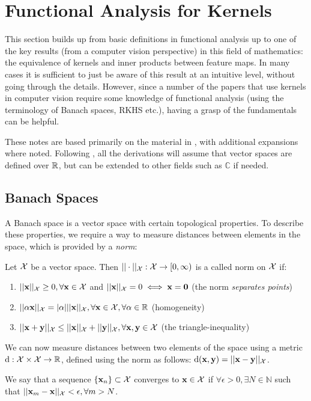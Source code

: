 \chapter{Functional Analysis for Kernels} \label{sec:functional-analysis}

This section builds up from basic definitions in functional analysis up to one of the key results (from a computer vision perspective) in this field of mathematics: the equivalence of kernels and inner products between feature maps.   In many cases it is sufficient to just be aware of this result at an intuitive level, without going through the details.  However, since a number of the papers that use kernels in computer vision require some knowledge of functional analysis (using the terminology of Banach spaces, RKHS etc.), having a grasp of the fundamentals can be helpful.  

These notes are based primarily on the material in \cite{sejdinovic2012rkhs}, with additional expansions where noted.  Following \cite{sejdinovic2012rkhs}, all the derivations will assume that vector spaces are defined over $\mathbb{R}$, but can be extended to other fields such as $\mathbb{C}$ if needed.

\section{Banach Spaces}

A Banach space is a vector space with certain topological properties. To describe these properties, we require a way to measure distances between elements in the space, which is provided by a \textit{norm}:

\begin{defn}
Let $\mathcal{X}$ be a vector space.  Then $|| \cdot ||_{\mathcal{X}} : \mathcal{X} \rightarrow [0,\infty)$ is a called norm on $\mathcal{X}$ if:
\begin{enumerate}
\item $|| \mathbf{x} ||_{\mathcal{X}} \geq 0 ,  \forall \mathbf{x} \in \mathcal{X}$ and $|| \mathbf{x} ||_{\mathcal{X}} = 0  \iff \mathbf{x} = \mathbf{0}$ (the norm \textit{separates points})
\item $|| \alpha \mathbf{x} ||_{\mathcal{X}} = | \alpha | || \mathbf{x} ||_{\mathcal{X}} ,  \forall \mathbf{x} \in \mathcal{X}, \forall \alpha \in \mathbb{R}$ (homogeneity)
\item $ || \mathbf{x} + \mathbf{y} ||_{\mathcal{X}} \leq || \mathbf{x} ||_{\mathcal{X}} + || \mathbf{y} ||_{\mathcal{X}}, \forall \mathbf{x}, \mathbf{y} \in \mathcal{X}$ (the triangle-inequality)
\end{enumerate}
\end{defn}

We can now measure distances between two elements of the space using a metric ${\operatorname{\text{d}}}: \mathcal{X} \times \mathcal{X} \to \mathbb{R}$, defined using the norm as follows: ${\operatorname{\text{d}}}(\mathbf{x}, \mathbf{y}) = || \mathbf{x} - \mathbf{y} ||_{\mathcal{X}}$.

\begin{defn}
We say that a sequence $\{\mathbf{x}_n\} \subset \mathcal{X}$ converges to $\mathbf{x} \in \mathcal{X}$ if $\forall \epsilon > 0, \exists N \in \mathbb{N}$ such that $|| \mathbf{x}_m - \mathbf{x} ||_{\mathcal{X}} < \epsilon, \forall m > N$.
\end{defn}


